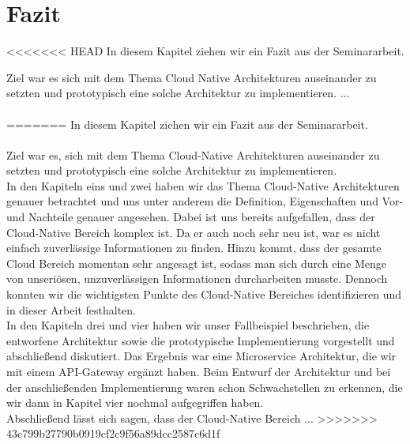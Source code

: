 \chapter{Fazit}

<<<<<<< HEAD
In diesem Kapitel ziehen wir ein Fazit aus der Seminararbeit.

Ziel war es sich mit dem Thema Cloud Native Architekturen auseinander zu setzten und prototypisch eine solche Architektur zu implementieren. ...\\
\\
=======
In diesem Kapitel ziehen wir ein Fazit aus der Seminararbeit.\\
\\
Ziel war es, sich mit dem Thema Cloud-Native Architekturen auseinander zu setzten und prototypisch eine solche Architektur zu implementieren.\\
In den Kapiteln eins und zwei haben wir das Thema Cloud-Native Architekturen genauer betrachtet und uns unter anderem die Definition, Eigenschaften und Vor-und Nachteile genauer angesehen. Dabei ist uns bereits aufgefallen, dass der Cloud-Native Bereich komplex ist. Da er auch noch sehr neu ist, war es nicht einfach zuverlässige Informationen zu finden. Hinzu kommt, dass der gesamte Cloud Bereich momentan sehr angesagt ist, sodass man sich durch eine Menge von unseriösen, unzuverlässigen Informationen durcharbeiten musste. Dennoch konnten wir die wichtigsten Punkte des Cloud-Native Bereiches identifizieren und in dieser Arbeit festhalten.\\
In den Kapiteln drei und vier haben wir unser Fallbeispiel beschrieben, die entworfene Architektur sowie die prototypische Implementierung vorgestellt und abschließend diskutiert. Das Ergebnis war eine Microservice Architektur, die wir mit einem API-Gateway ergänzt haben. Beim Entwurf der Architektur und bei der anschließenden Implementierung waren schon Schwachstellen zu erkennen, die wir dann in Kapitel vier nochmal aufgegriffen haben.\\
Abschließend lässt sich sagen, dass der Cloud-Native Bereich ...
>>>>>>> 43c799b27790b0919cf2c9f56a89dcc2587c6d1f
